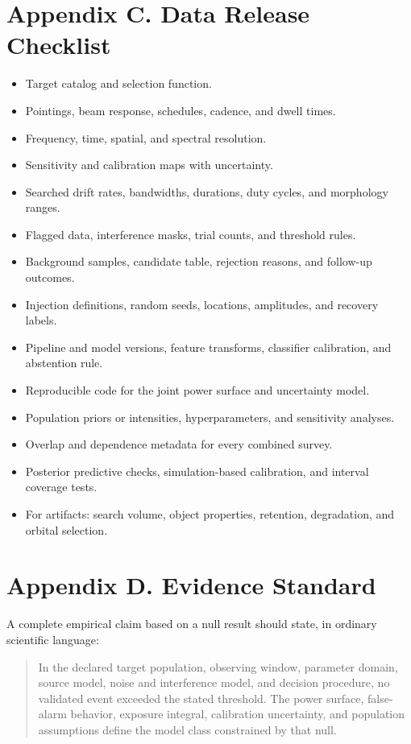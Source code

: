 \documentclass[11pt,a4paper]{article}
\begin{document}
\section{Appendix C. Data Release Checklist}\label{appendix-c-data-release-checklist}

\begin{itemize}
\item
  Target catalog and selection function.
\item
  Pointings, beam response, schedules, cadence, and dwell times.
\item
  Frequency, time, spatial, and spectral resolution.
\item
  Sensitivity and calibration maps with uncertainty.
\item
  Searched drift rates, bandwidths, durations, duty cycles, and morphology ranges.
\item
  Flagged data, interference masks, trial counts, and threshold rules.
\item
  Background samples, candidate table, rejection reasons, and follow-up outcomes.
\item
  Injection definitions, random seeds, locations, amplitudes, and recovery labels.
\item
  Pipeline and model versions, feature transforms, classifier calibration, and abstention rule.
\item
  Reproducible code for the joint power surface and uncertainty model.
\item
  Population priors or intensities, hyperparameters, and sensitivity analyses.
\item
  Overlap and dependence metadata for every combined survey.
\item
  Posterior predictive checks, simulation-based calibration, and interval coverage tests.
\item
  For artifacts: search volume, object properties, retention, degradation, and orbital selection.
\end{itemize}

\section{Appendix D. Evidence Standard}\label{appendix-d-evidence-standard}

A complete empirical claim based on a null result should state, in ordinary scientific language:

\begin{quote}
In the declared target population, observing window, parameter domain, source model, noise and interference model, and decision procedure, no validated event exceeded the stated threshold. The power surface, false-alarm behavior, exposure integral, calibration uncertainty, and population assumptions define the model class constrained by that null.
\end{quote}
\end{document}
